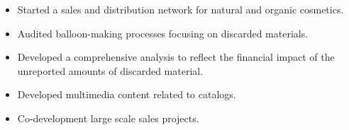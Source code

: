 \documentclass[10pt,a4paper,ragged2e]{altacv}
\begin{document}
\begin{itemize}
\item Started a sales and distribution network for natural and organic cosmetics.
\end{itemize}
\divider

\begin{itemize}
\item Audited balloon-making processes focusing on discarded materials.
\item Developed a comprehensive analysis to reflect the financial impact of the unreported amounts of discarded material.
\end{itemize}
\divider

\begin{itemize}
\item Developed multimedia content related to catalogs.
\item Co-development large scale sales projects.
\end{itemize}
\divider

\clearpage
\end{document}
